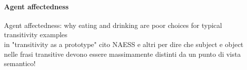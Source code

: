 
\paragraph{Agent affectedness} 
Agent affectedness: why eating and drinking are poor choices for typical transitivity examples\\
in "transitivity as a prototype" cito NAESS e altri per dire che subject e object nelle frasi transitive devono essere massimamente distinti da un punto di vista semantico!


